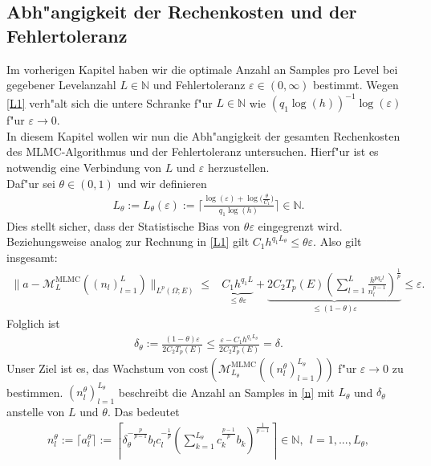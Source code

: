 \subsection{Abh"angigkeit der Rechenkosten und der Fehlertoleranz}
Im vorherigen Kapitel haben wir die optimale Anzahl an Samples pro Level bei gegebener Levelanzahl $L\in\mathbb{N}$ und Fehlertoleranz $\varepsilon\in(0,\infty)$  bestimmt. Wegen \eqref{L1} verh"alt sich die untere Schranke f"ur $L\in\mathbb{N}$ wie $(q_1\log(h))^{-1}\log(\varepsilon)$ f"ur $\varepsilon\rightarrow 0$.\\
In diesem Kapitel wollen wir nun die Abh"angigkeit der gesamten Rechenkosten des MLMC-Algorithmus und der Fehlertoleranz untersuchen. Hierf"ur ist es notwendig eine Verbindung von $L$ und $\varepsilon$ herzustellen.\\
Daf"ur sei $\theta\in (0,1)$ und wir definieren
\begin{align}\label{L}
L_\theta:=L_\theta(\varepsilon):=\Big\lceil \frac{\log(\varepsilon)+\log{(\frac{\theta}{C_1}})}{q_1\log(h)}\Big \rceil\in\mathbb{N}.
\end{align}
Dies stellt sicher, dass der Statistische Bias von $\theta\varepsilon$ eingegrenzt wird. Beziehungsweise analog zur Rechnung in \eqref{L1} gilt $C_1h^{q_1L_\theta}\leq \theta\varepsilon$. Also gilt insgesamt:
\begin{align*}
\|a-\mathcal{M}_L^{\text{MLMC}}((n_l)_{l=1}^L)\|_{L^p(\Omega;E)}\leq &\underbrace{C_1 h^{q_1L}}_{\leq \theta\varepsilon}+\underbrace{2C_2 T_p(E)\left(\sum_{l=1}^L \frac{h^{p q_2 l}}{n_l^{p-1}}\right)^{\frac{1}{p}}}_{\leq(1-\theta)\varepsilon}\leq\varepsilon.
\end{align*} Folglich ist
\begin{align*}
\delta_\theta:=\frac{(1-\theta)\varepsilon}{2C_2T_p(E)}\leq \frac{\varepsilon-C_1h^{q_1L_\theta}}{2C_2T_p(E)}=\delta.
\end{align*}
Unser Ziel ist es, das Wachstum von $\text{cost}(\mathcal{M}_{L_\theta}^{\text{MLMC}}((n_l^\theta)_{l=1}^{L_\theta}))$ f"ur $\varepsilon\rightarrow 0$ zu bestimmen. $(n_l^\theta)_{l=1}^{L_\theta}$ beschreibt die Anzahl an Samples in \eqref{n} mit $L_\theta$ und $\delta_\theta$ anstelle von $L$ und $\theta$. Das bedeutet
\begin{align*}
n_l^\theta:=\lceil a_l^\theta \rceil:=\left\lceil \delta_\theta^{-\frac{p}{p-1}}b_lc_l^{-\frac{1}{p}}\left(\sum_{k=1}^{L_\theta} c_k^{\frac{p-1}{p}}b_k\right)^{\frac{1}{p-1}}\right\rceil \in \mathbb{N}, \ \ l=1,...,L_\theta,
\end{align*}
